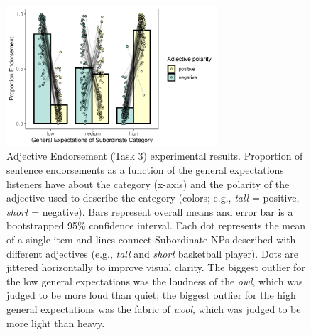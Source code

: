 \documentclass[doc]{apa6}
\begin{document}
\begin{figure}[!t]
\centering
\includegraphics[width=0.7\textwidth]{figs/bars_adj_finalExpt_prereg_bars_syncDodge.pdf}
\caption{Adjective Endorsement (Task 3) experimental results. Proportion of sentence endorsements as a function of the general expectations listeners have about the category (x-axis) and the polarity of the adjective used to describe the category (colors; e.g., \emph{tall} = positive, \emph{short} = negative). Bars represent overall means and error bar is a bootstrapped 95\% confidence interval. Each dot represents the mean of a single item and lines connect Subordinate NPs described with different adjectives (e.g., \emph{tall} and \emph{short} basketball player). Dots are jittered horizontally to improve visual clarity. The biggest outlier for the low general expectations was the loudness of the \emph{owl}, which was judged to be more loud than quiet; the biggest outlier for the high general expectations was the fabric of \emph{wool}, which was judged to be more light than heavy. }\label{fig:adjEndorseMain}
\end{figure}
\end{document}
